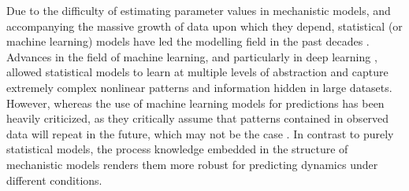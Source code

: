 Due to the difficulty of estimating parameter values in mechanistic models, and accompanying the massive growth of data upon which they depend, statistical (or machine learning) models have led the modelling field in the past decades \cite{Cox:2017hv}. 
Advances in the field of machine learning, and particularly in deep learning \cite{LeCun2015}, allowed statistical models to learn at multiple levels of abstraction and capture extremely complex nonlinear patterns and information hidden in large datasets. 
However, whereas the use of machine learning models for predictions has been heavily criticized, as they critically assume that patterns contained in observed data will repeat in the future, which may not be the case \cite{dormann2007,Barnosky2012}. %
In contrast to purely statistical models, the process knowledge embedded in the structure of mechanistic models renders them more robust for predicting dynamics under different conditions.


